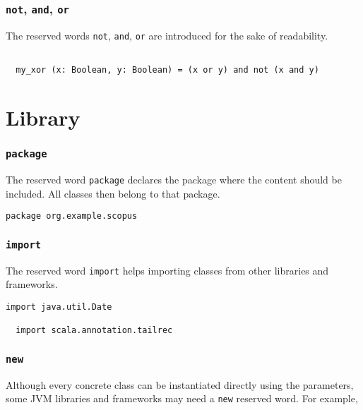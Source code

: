 \documentclass[12pt,a4paper]{book}
\newcommand{\srccode}[1]{\texttt{{#1}}}
\newcommand{\reservedWord}[1]{{\color{blue}\srccode{#1}}\xspace}
\newcommand{\snot}{\reservedWord{not}}
\newcommand{\sand}{\reservedWord{and}}
\newcommand{\sor}{\reservedWord{or}}
\newcommand{\spackage}{\reservedWord{package}}
\newcommand{\simport}{\reservedWord{import}}
\newcommand{\snew}{\reservedWord{new}}
\begin{document}
    \subsubsection{\snot, \sand, \sor}

    The reserved words \snot, \sand, \sor are introduced for the sake of readability.

    \begin{lstlisting}[label={lst:exampleNotAndOr}]

  my_xor (x: Boolean, y: Boolean) = (x or y) and not (x and y)

    \end{lstlisting}


    \section{Library}

    \subsubsection{\spackage}

    The reserved word \spackage declares the package where the content should be included.
    All classes then belong to that package.

    \begin{lstlisting}[label={lst:examplePackage}]
  package org.example.scopus
    \end{lstlisting}

    \subsubsection{\simport}

    The reserved word \simport helps importing classes from other libraries and frameworks.

    \begin{lstlisting}[label={lst:exampleImport}]
  import java.util.Date

  import scala.annotation.tailrec
    \end{lstlisting}

    \subsubsection{\snew}

    Although every concrete class can be instantiated directly using the parameters, some JVM libraries and frameworks may need a \snew reserved word.
    For example,
\end{document}
